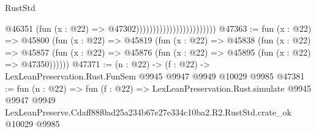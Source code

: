 \begin{lexlean}{RustStd}
\begin{coremodule}
                                                @46351
                                                  (fun (x : @22) => @47302))))))))))))))))))))))))
@47363 := fun (x : @22) =>
  @45800
    (fun (x : @22) =>
    @45819
      (fun (x : @22) =>
      @45838
        (fun (x : @22) =>
        @45857 (fun (x : @22) => @45876 (fun (x : @22) => @45895 (fun (x : @22) => @47350))))))
@47371 := (n : @22) -> (f : @22) -> LexLeanPreservation.Rust.FunSem @9945 @9947 @9949 @10029 @9985
@47381 := fun (n : @22) =>
  fun (f : @22) =>
  LexLeanPreservation.Rust.simulate
    @9945
    @9947
    @9949
    LexLeanPreserve.Cdaff88f0ad25a234b67e27e334c10ba2.R2.RustStd.crate_ok
    @10029
    @9985
\end{coremodule}
\end{lexlean}
